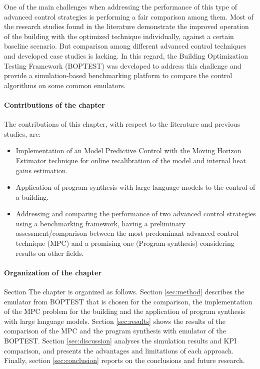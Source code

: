 One of the main challenges when addressing the performance of this type of advanced control strategies is performing a fair comparison among them. Most of the research studies found in the literature demonstrate the improved operation of the building with the optimized technique individually, against a certain baseline scenario. But comparison among different advanced control techniques and developed case studies is lacking. In this regard, the Building Optimization Testing Framework (BOPTEST) \cite{Blum2021} was developed to address this challenge and provide a simulation-based benchmarking platform to compare the control algorithms on some common emulators.

\paragraph{Contributions of the chapter}
\label{sec:contribution}
The contributions of this chapter, with respect to the literature and previous studies, are:
\begin{itemize}
  \item Implementation of an Model Predictive Control with the Moving Horizon Estimator technique for online recalibration of the model and internal heat gains estimation.
  \item Application of program synthesis with large language models to the control of a building.
  \item Addressing and comparing the performance of two advanced control strategies using a benchmarking framework, having a preliminary assessment/comparison between the most predominant advanced control technique (MPC) and a promising one (Program synthesis) considering results on other fields.
\end{itemize}

\paragraph{Organization of the chapter}
Section \label{sec:organization}
The chapter is organized as follows. Section \ref{sec:method}  describes the emulator from BOPTEST that is chosen for the comparison, the implementation of the MPC problem for the building and the application of program synthesis with large language models. Section \ref{sec:results} shows the results of the comparison of the MPC and the program synthesis with emulator of the BOPTEST. Section \ref{sec:discussion} analyses the simulation results and KPI comparison, and presents the advantages and limitations of each approach. Finally, section \ref{sec:conclusion} reports on the conclusions and future research.

